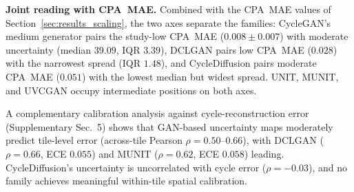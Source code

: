 \noindent\textbf{Joint reading with CPA~MAE.}
Combined with the CPA~MAE values of Section~\ref{sec:results_scaling}, the two axes
separate the families: CycleGAN's medium generator pairs the study-low CPA~MAE
($0.008 \pm 0.007$) with moderate uncertainty (median $39.09$, IQR $3.39$), DCLGAN pairs
low CPA~MAE ($0.028$) with the narrowest spread (IQR $1.48$), and CycleDiffusion pairs
moderate CPA~MAE ($0.051$) with the lowest median but widest spread.
UNIT, MUNIT, and UVCGAN occupy intermediate positions on both axes.

A complementary calibration analysis against cycle-reconstruction error
(Supplementary Sec.~5) shows that GAN-based uncertainty maps moderately predict
tile-level error (across-tile Pearson $\rho = 0.50$--$0.66$), with DCLGAN
($\rho = 0.66$, ECE $0.055$) and MUNIT ($\rho = 0.62$, ECE $0.058$) leading.
CycleDiffusion's uncertainty is uncorrelated with cycle error ($\rho = {-}0.03$),
and no family achieves meaningful within-tile spatial calibration.

%
%
